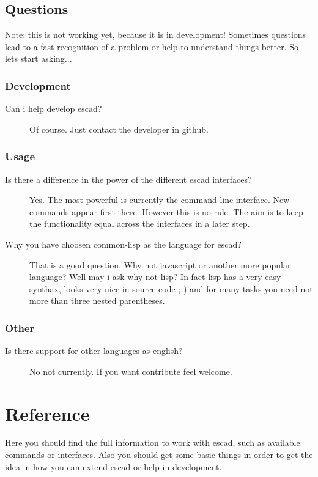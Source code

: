 \documentclass[a4paper, 12pt, openany]{scrbook}
\begin{document}
\section{Questions}
Note: this is not working yet, because it is in development!
Sometimes questions lead to a fast recognition of a problem or help to understand things better. So lets start asking...
\subsection{Development}
\begin{description}
\item[Can i help develop escad?] Of course. Just contact the developer in github.
\end{description}
\subsection{Usage}
\begin{description}
\item[Is there a difference in the power of the different escad interfaces?] Yes. The most powerful is currently the command line interface. New commands appear first there. However this is no rule. The aim is to keep the functionality equal across the interfaces in a later step.
\item[Why you have choosen common-lisp as the language for escad?] That is a good question. Why not javascript or another more popular language? Well may i ask why not lisp? In fact lisp has a very easy synthax, looks very nice in source code ;-) and for many tasks you need not more than three nested parentheses.
\end{description}
\subsection{Other}
\begin{description}
\item[Is there support for other languages as english?]  No not currently. If you want contribute feel welcome.
\end{description}
\chapter{Reference}
Here you should find the full information to work with escad, such as available commands or interfaces. Also you should get some basic things in order to get the idea in how you can extend escad or help in development.
\end{document}
